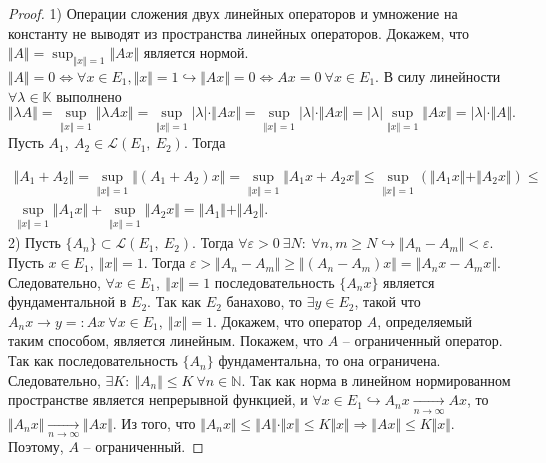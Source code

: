 \begin{proof}
1) Операции сложения двух линейных операторов и умножение на константу не выводят из пространства линейных операторов. Докажем, что $\displaystyle \Vert A\Vert =\sup _{\Vert x\Vert =1}\Vert Ax\Vert $ является нормой. $\displaystyle \Vert A\Vert =0\Leftrightarrow \forall x\in E_{1} ,\Vert x\Vert =1\hookrightarrow \Vert Ax\Vert =0\Leftrightarrow Ax=0\ \forall x\in E_{1}$. В силу линейности $\displaystyle \forall \lambda \in \mathbb{K}$ выполнено
\begin{equation*}
\Vert \lambda A\Vert =\sup _{\Vert x\Vert =1}\Vert \lambda Ax\Vert =\sup _{\Vert x\Vert =1}| \lambda | \cdotp \Vert Ax\Vert =\sup _{\Vert x\Vert =1}| \lambda | \cdotp \Vert Ax\Vert =| \lambda | \sup _{\Vert x\Vert =1}\Vert Ax\Vert =| \lambda | \cdotp \Vert A\Vert .
\end{equation*}
Пусть $\displaystyle A_{1} ,\ A_{2} \in \mathcal{L}( E_{1} ,\ E_{2})$. Тогда


\begin{gather*}
\Vert A_{1} +A_{2}\Vert =\sup _{\Vert x\Vert =1}\Vert ( A_{1} +A_{2}) x\Vert =\sup _{\Vert x\Vert =1}\Vert A_{1} x+A_{2} x\Vert \leqslant \sup _{\Vert x\Vert =1}(\Vert A_{1} x\Vert +\Vert A_{2} x\Vert ) \leqslant \\
\sup _{\Vert x\Vert =1}\Vert A_{1} x\Vert +\sup _{\Vert x\Vert =1}\Vert A_{2} x\Vert =\Vert A_{1}\Vert +\Vert A_{2}\Vert .
\end{gather*}
2) Пусть $\displaystyle \{A_{n}\} \subset \mathcal{L}( E_{1} ,\ E_{2})$. Тогда $\displaystyle \forall \varepsilon  >0\ \exists N:\ \forall n,m\geqslant N\hookrightarrow \Vert A_{n} -A_{m}\Vert < \varepsilon $. Пусть $\displaystyle x\in E_{1} ,\ \Vert x\Vert =1$. Тогда $\displaystyle \varepsilon  >\Vert A_{n} -A_{m}\Vert \geqslant \Vert ( A_{n} -A_{m}) x\Vert =\Vert A_{n} x-A_{m} x\Vert $. Следовательно, $\displaystyle \forall x\in E_{1} ,\ \Vert x\Vert =1$ последовательность $\displaystyle \{A_{n} x\}$ является фундаментальной в $\displaystyle E_{2}$. Так как $\displaystyle E_{2}$ банахово, то $\displaystyle \exists y\in E_{2}$, такой что $\displaystyle A_{n} x\rightarrow y=:Ax\ \forall x\in E_{1} ,\ \Vert x\Vert =1$. Докажем, что оператор $\displaystyle A$, определяемый таким способом, является линейным. Покажем, что $\displaystyle A$ -- ограниченный оператор. Так как последовательность $\displaystyle \{A_{n}\}$ фундаментальна, то она ограничена. Следовательно, $\displaystyle \exists K:\ \Vert A_{n}\Vert \leqslant K\ \forall n\in \mathbb{N}$. Так как норма в линейном нормированном пространстве является непрерывной функцией, и $\displaystyle \forall x\in E_{1} \hookrightarrow A_{n} x\xrightarrow[n\rightarrow \infty ]{} Ax$, то $\displaystyle \Vert A_{n} x\Vert \xrightarrow[n\rightarrow \infty ]{}\Vert Ax\Vert $. Из того, что $\displaystyle \Vert A_{n} x\Vert \leqslant \Vert A\Vert \cdotp \Vert x\Vert \leqslant K\Vert x\Vert \Rightarrow \Vert Ax\Vert \leqslant K\Vert x\Vert $. Поэтому, $\displaystyle A$ -- ограниченный.


\end{proof}
